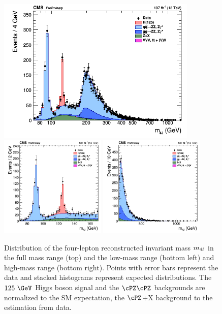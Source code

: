 {%
\begin{figure}[!htb]
	\vspace*{0.3cm}
	\begin{center}
		\includegraphics[width=0.85\textwidth]{Figures/KinDistr/M4lMain_Unblinded_4l_InclusiveRun2.png} \\ %
		\includegraphics[width=0.45\textwidth]{Figures/KinDistr/M4lMainZoomed_Unblinded_4l_InclusiveRun2.png} %
		\includegraphics[width=0.45\textwidth]{Figures/KinDistr/M4lMainHighMass_Unblinded_4l_InclusiveRun2.png} %
		\caption{Distribution of the four-lepton reconstructed invariant mass $m_{4\ell}$ in the full mass range (top) and the low-mass range (bottom left) and high-mass range (bottom right). Points with error bars represent the data and stacked histograms represent expected distributions. The $125~\GeV$ Higgs boson signal and the $\cPZ\cPZ$ backgrounds are normalized to the SM expectation, the $\cPZ$+X background to the estimation from data.
			\label{fig:Mass4lC}}
	\end{center}
\end{figure}

}
